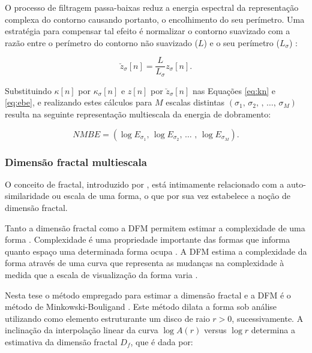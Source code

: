 O processo de filtragem passa-baixas reduz a energia espectral da representação complexa do contorno causando portanto, o encolhimento do seu perímetro. Uma estratégia para compensar tal efeito é normalizar o contorno suavizado com a razão entre o perímetro do contorno não suavizado ($L$) e o seu perímetro ($L_{\sigma}$) \cite{Cesar:1996,Costa:1997}:

\begin{equation}
\breve{z}_{\sigma}[n] = \frac{L}{L_{\sigma}}z_{\sigma}[n]\text{.}
\end{equation}

Substituindo $\kappa[n]$ por $\kappa_{\sigma}[n]$ e $z[n]$ por $\breve{z}_{\sigma}[n]$ nas Equações \ref{eq:kn} e \ref{eq:ebe}, e realizando estes cálculos para $M$ escalas distintas $(\sigma_1\text{, }\sigma_2\text{, }\text{, }\ldots\text{, }\sigma_M)$ resulta na seguinte representação multiescala da energia de dobramento:

\begin{equation}
NMBE = (\log{E_{\sigma_{1}}}\text{, }\log{E_{\sigma_{2}}}\text{, }\ldots \text{ , }\log{E_{\sigma_{M}}})\text{.}
\label{eq:nmbe}
\end{equation}
 
\subsubsection*{Dimensão fractal multiescala}

O conceito de fractal, introduzido por , está intimamente relacionado com a auto-similaridade ou escala de uma forma, o que por sua vez estabelece a noção de dimensão fractal.

Tanto a dimensão fractal como a \ac{DFM} permitem estimar a complexidade de uma forma \cite{Backes:2012}. Complexidade é uma propriedade importante das formas que informa quanto espaço uma determinada forma ocupa \cite{Costa:2009}. A \ac{DFM} estima a complexidade da forma através de uma curva que representa as mudanças na complexidade à medida que a escala de visualização da forma varia \cite{Florindo:2012}.

Nesta tese o método empregado para estimar a dimensão fractal e a \acl{DFM} é o método de Minkowski-Bouligand \cite{Costa:2009}. Este método dilata a forma sob análise utilizando como elemento estruturante um disco de raio $r > 0$, sucessivamente. A inclinação da interpolação linear da curva $\log{A(r)}$ versus $\log{r}$ determina a estimativa da dimensão fractal $D_f$, que é dada por:

